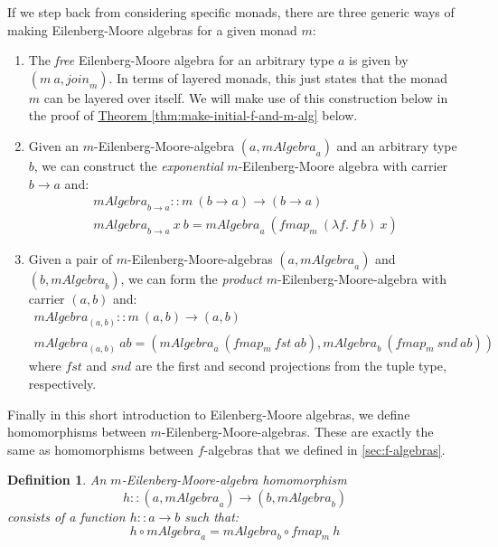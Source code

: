 \documentclass{jfp1}
\newtheorem{definition}{Definition}
\newcommand{\thmref}[1]{\hyperref[#1]{Theorem \ref*{#1}}}
\begin{document}
If we step back from considering specific monads, there are three
generic ways of making Eilenberg-Moore algebras for a given monad $m$:
\begin{enumerate}
\item The \emph{free} Eilenberg-Moore algebra for an arbitrary type
  $a$ is given by $(m~a, \mathit{join}_m)$. In terms of layered
  monads, this just states that the monad $m$ can be layered over
  itself. We will make use of this construction below in the proof of
  \thmref{thm:make-initial-f-and-m-alg} below.
\item Given an $m$-Eilenberg-Moore-algebra $(a, \mathit{mAlgebra}_a)$
  and an arbitrary type $b$, we can construct the \emph{exponential}
  $m$-Eilenberg-Moore algebra with carrier $b \to a$ and:
  \begin{displaymath}
    \begin{array}{l}
      \mathit{mAlgebra}_{b \to a} :: m~(b \to a) \to (b \to a) \\
      \mathit{mAlgebra}_{b \to a}~x~b = \mathit{mAlgebra}_a~(\mathit{fmap}_m~(\lambda f.~f~b)~x)
    \end{array}
  \end{displaymath}
\item Given a pair of $m$-Eilenberg-Moore-algebras $(a,
  \mathit{mAlgebra}_a)$ and $(b, \mathit{mAlgebra}_b)$, we can form
  the \emph{product} $m$-Eilenberg-Moore-algebra with carrier $(a,b)$
  and:
  \begin{displaymath}
    \begin{array}{l}
      \mathit{mAlgebra}_{(a,b)} :: m~(a,b) \to (a,b) \\
      \mathit{mAlgebra}_{(a,b)}~\mathit{ab} = (\mathit{mAlgebra}_a~(\mathit{fmap}_m~\mathit{fst}~\mathit{ab}), \mathit{mAlgebra}_b~(\mathit{fmap}_m~\mathit{snd}~\mathit{ab}))
    \end{array}
  \end{displaymath}
  where $\mathit{fst}$ and $\mathit{snd}$ are the first and second
  projections from the tuple type, respectively.
\end{enumerate}

Finally in this short introduction to Eilenberg-Moore algebras, we
define homomorphisms between $m$-Eilenberg-Moore-algebras. These are
exactly the same as homomorphisms between $f$-algebras that we defined
in \autoref{sec:f-algebras}.

\begin{definition}
  An \emph{$m$-Eilenberg-Moore-algebra homomorphism}
  \begin{displaymath}
    h :: (a, \mathit{mAlgebra}_a) \to (b, \mathit{mAlgebra}_b)
  \end{displaymath}
  consists of a function $h :: a \to b$ such that:
  \begin{equation}
    \label{eq:em-alg-homomorphism}
    h \circ \mathit{mAlgebra}_a = \mathit{mAlgebra}_b \circ \mathit{fmap}_m~h
  \end{equation}
\end{definition}
\end{document}
